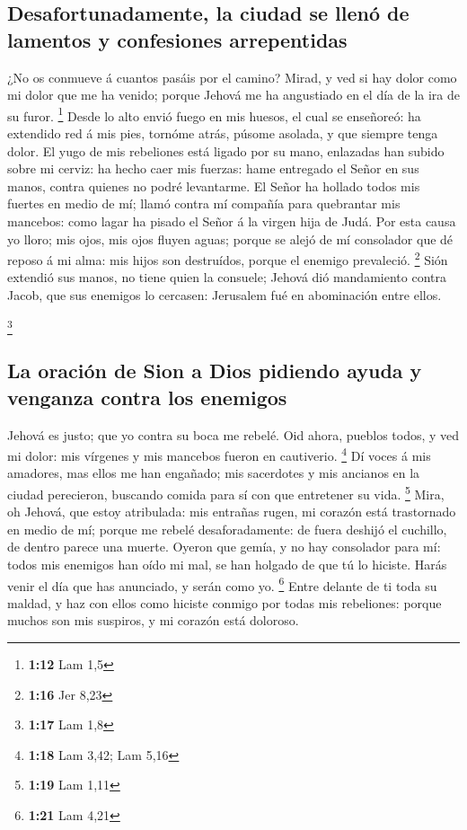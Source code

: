 \hypertarget{desafortunadamente-la-ciudad-se-llenuxf3-de-lamentos-y-confesiones-arrepentidas}{%
\subsection{Desafortunadamente, la ciudad se llenó de lamentos y
confesiones
arrepentidas}\label{desafortunadamente-la-ciudad-se-llenuxf3-de-lamentos-y-confesiones-arrepentidas}}

 ¿No os conmueve á cuantos pasáis por el camino? Mirad, y
ved si hay dolor como mi dolor que me ha venido; porque Jehová me ha
angustiado en el día de la ira de su furor. \footnote{\textbf{1:12} Lam
  1,5}  Desde lo alto envió fuego en mis huesos, el cual se
enseñoreó: ha extendido red á mis pies, tornóme atrás, púsome asolada, y
que siempre tenga dolor.  El yugo de mis rebeliones está
ligado por su mano, enlazadas han subido sobre mi cerviz: ha hecho caer
mis fuerzas: hame entregado el Señor en sus manos, contra quienes no
podré levantarme.  El Señor ha hollado todos mis fuertes en
medio de mí; llamó contra mí compañía para quebrantar mis mancebos: como
lagar ha pisado el Señor á la virgen hija de Judá.  Por
esta causa yo lloro; mis ojos, mis ojos fluyen aguas; porque se alejó de
mí consolador que dé reposo á mi alma: mis hijos son destruídos, porque
el enemigo prevaleció. \footnote{\textbf{1:16} Jer 8,23} 
Sión extendió sus manos, no tiene quien la consuele; Jehová dió
mandamiento contra Jacob, que sus enemigos lo cercasen: Jerusalem fué en
abominación entre ellos.

\footnote{\textbf{1:17} Lam 1,8}

\hypertarget{la-oraciuxf3n-de-sion-a-dios-pidiendo-ayuda-y-venganza-contra-los-enemigos}{%
\subsection{La oración de Sion a Dios pidiendo ayuda y venganza contra
los
enemigos}\label{la-oraciuxf3n-de-sion-a-dios-pidiendo-ayuda-y-venganza-contra-los-enemigos}}

 Jehová es justo; que yo contra su boca me rebelé. Oid
ahora, pueblos todos, y ved mi dolor: mis vírgenes y mis mancebos fueron
en cautiverio. \footnote{\textbf{1:18} Lam 3,42; Lam 5,16} 
Dí voces á mis amadores, mas ellos me han engañado; mis sacerdotes y mis
ancianos en la ciudad perecieron, buscando comida para sí con que
entretener su vida. \footnote{\textbf{1:19} Lam 1,11} 
Mira, oh Jehová, que estoy atribulada: mis entrañas rugen, mi corazón
está trastornado en medio de mí; porque me rebelé desaforadamente: de
fuera deshijó el cuchillo, de dentro parece una muerte. 
Oyeron que gemía, y no hay consolador para mí: todos mis enemigos han
oído mi mal, se han holgado de que tú lo hiciste. Harás venir el día que
has anunciado, y serán como yo. \footnote{\textbf{1:21} Lam 4,21}
 Entre delante de ti toda su maldad, y haz con ellos como
hiciste conmigo por todas mis rebeliones: porque muchos son mis
suspiros, y mi corazón está doloroso.

